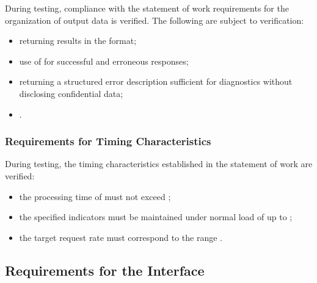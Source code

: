 \documentclass[12pt,a4paper]{extarticle}
\begin{document}
\begin{hseExample}
During testing, compliance with the statement of work requirements for the organization of output data is verified. The following are subject to verification:

\begin{itemize}[leftmargin=1.25cm]
    \item returning results in the  format;
    \item use of  for successful and erroneous responses;
    \item returning a structured error description sufficient for diagnostics without disclosing confidential data;
    \item {}.
\end{itemize}
\end{hseExample}

\subsubsection{Requirements for Timing Characteristics}

\begin{hseExample}
During testing, the timing characteristics established in the statement of work are verified:

\begin{itemize}[leftmargin=1.25cm]
    \item the processing time of  must not exceed ;
    \item the specified indicators must be maintained under normal load of up to ;
    \item the target request rate must correspond to the range .
\end{itemize}
\end{hseExample}

\subsection{Requirements for the Interface}
\end{document}
